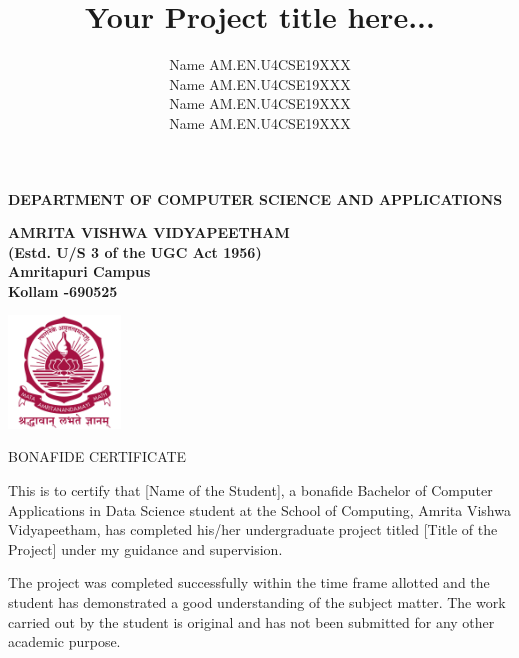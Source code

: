 \documentclass[oneside,12pt]{Classes/CUEDthesisPSnPDF}
\title{Your Project title here...}
\author{Name AM.EN.U4CSE19XXX\\ Name AM.EN.U4CSE19XXX\\ Name AM.EN.U4CSE19XXX\\ Name AM.EN.U4CSE19XXX}
\begin{document}
\maketitle


\begin{center}


{\normalsize {\bfseries{DEPARTMENT OF COMPUTER SCIENCE AND APPLICATIONS\\[1ex]}}}


{\normalsize {\bfseries{AMRITA VISHWA VIDYAPEETHAM \\ (Estd. U/S 3 of the UGC Act 1956) \\[1ex]Amritapuri  Campus \\[1ex] Kollam -690525\\[1ex]}}}

	\includegraphics[width=30mm]{UNIVEMBLEM.jpg}


				\rmfamily\bfseries\upshape\Large

				BONAFIDE CERTIFICATE \\[2ex] %

\end{center}


\rmfamily\mdseries\upshape\normalsize					

This is to certify that [Name of the Student], a bonafide Bachelor of Computer Applications in Data Science student at the School of Computing, Amrita Vishwa Vidyapeetham, has completed his/her undergraduate project titled [Title of the Project] under my guidance and supervision.

The project was completed successfully within the time frame allotted and the student has demonstrated a good understanding of the subject matter. The work carried out by the student is original and has not been submitted for any other academic purpose.
\end{document}
